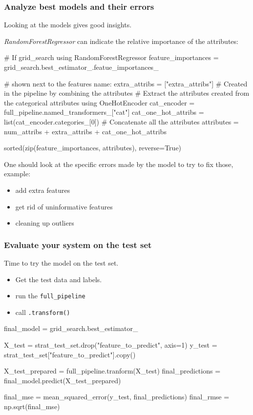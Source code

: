     \subsubsection*{Analyze best models and their errors}
    Looking at the models gives good insights.

    \emph{RandomForestRegressor} can indicate the relative importance of the attributes:
    \begin{python}
        # If grid_search using RandomForestRegressor
        feature_importances = grid_search.best_estimator_.featue_importances_

        # shown next to the features name:
        extra_attribs = ["extra_attribs"]       # Created in the pipeline by combining the attributes
        # Extract the attributes created from the categorical attributes using OneHotEncoder
        cat_encoder = full_pipeline.named_transformers_["cat"]
        cat_one_hot_attribs = list(cat_encoder.categories_[0])
        # Concatenate all the attributes
        attributes = num_attribs + extra_attribs + cat_one_hot_attribs

        sorted(zip(feature_importances, attributes), reverse=True)
    \end{python}

    One should look at the specific errors made by the model to try to fix those, example:
    \begin{itemize}
        \item add extra features
        \item get rid of uninformative features
        \item cleaning up outliers
    \end{itemize}

    \subsubsection*{Evaluate your system on the test set}
        Time to try the model on the test set.
        \begin{itemize}
            \item Get the test data and labels.
            \item run the \verb;full_pipeline;
            \item call \verb;.transform();
        \end{itemize}

        \begin{python}
            final_model = grid_search.best_estimator_

            X_test = strat_test_set.drop("feature_to_predict", axis=1)
            y_test = strat_test_set["feature_to_predict"].copy()

            X_test_prepared = full_pipeline.tranform(X_test)
            final_predictions = final_model.predict(X_test_prepared)

            final_mse = mean_squared_error(y_test, final_predictions)
            final_rmse = np.sqrt(final_mse)
        \end{python}

